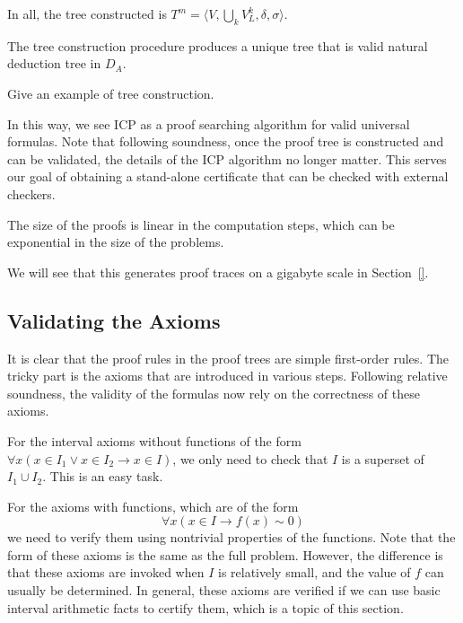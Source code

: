 \documentclass[envcountsect]{llncs}
\begin{document}
 In all, the tree constructed is $T^m = \langle V, \bigcup_k V_L^k, \delta,
\sigma\rangle$. 

\begin{theorem}\label{successful_tree}
The tree construction procedure produces a unique tree that is valid natural
deduction tree in $D_A$. 
\end{theorem}

\begin{example}
Give an example of tree construction.
\end{example}

In this way, we see ICP as a proof searching algorithm for valid universal
formulas. Note that following soundness, once the proof tree is constructed and
can be validated, the details of the ICP algorithm no longer matter. This serves
our goal of obtaining a stand-alone certificate that can be checked with
external checkers.

\begin{proposition}
 The size of the proofs is linear in the computation steps, which can be
exponential in the size of the problems. 
\end{proposition}

We will see that this generates proof traces on a gigabyte scale in
Section~\ref{}. 




\subsection{Validating the Axioms}\label{validate}

It is clear that the proof rules in the proof trees are simple first-order
rules. The tricky part is the axioms that are introduced in various
steps. Following relative soundness, the validity of the formulas now rely on the
correctness of these axioms.

For the interval axioms without functions of the form $\forall x(x\in I_1\vee
x\in I_2\rightarrow x\in I)$, we only need to check that $I$ is a superset of
$I_1\cup I_2$. This is an easy task.

For the axioms with functions, which are of the form
$$\forall x (x\in I \rightarrow f(x)\sim 0)$$
we need to verify them using nontrivial properties of the functions. Note that
the form of these axioms is the same as the full problem. However, the
difference is that these axioms are invoked when $I$ is relatively small, and
the value of $f$ can usually be determined. In general, these axioms are
verified if we can use basic interval arithmetic facts to certify them, which is
a topic of this section.
\end{document}
